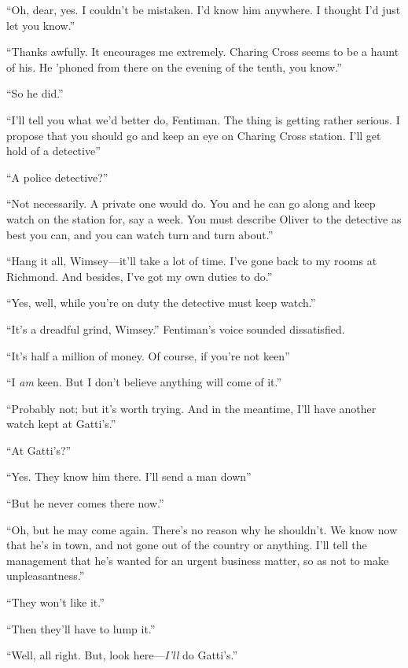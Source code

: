 \enquote{Oh, dear, yes. I couldn't be mistaken. I'd know him anywhere. I thought I'd just let you know.}

\enquote{Thanks awfully. It encourages me extremely. Charing Cross seems to be a haunt of his. He 'phoned from there on the evening of the tenth, you know.}

\enquote{So he did.}

\enquote{I'll tell you what we'd better do, Fentiman. The thing is getting rather serious. I propose that you should go and keep an eye on Charing Cross station. I'll get hold of a detective\longdash}

\enquote{A police detective?}

\enquote{Not necessarily. A private one would do. You and he can go along and keep watch on the station for, say a week. You must describe Oliver to the detective as best you can, and you can watch turn and turn about.}

\enquote{Hang it all, Wimsey\allowbreak---\allowbreak it'll take a lot of time. I've gone back to my rooms at Richmond. And besides, I've got my own duties to do.}

\enquote{Yes, well, while you're on duty the detective must keep watch.}

\enquote{It's a dreadful grind, Wimsey.} Fentiman's voice sounded dissatisfied.

\enquote{It's half a million of money. Of course, if you're not keen\longdash}

\enquote{I \textit{am} keen. But I don't believe anything will come of it.}

\enquote{Probably not; but it's worth trying. And in the meantime, I'll have another watch kept at Gatti's.}

\enquote{At Gatti's?}

\enquote{Yes. They know him there. I'll send a man down\longdash}

\enquote{But he never comes there now.}

\enquote{Oh, but he may come again. There's no reason why he shouldn't. We know now that he's in town, and not gone out of the country or anything. I'll tell the management that he's wanted for an urgent business matter, so as not to make unpleasantness.}

\enquote{They won't like it.}

\enquote{Then they'll have to lump it.}

\enquote{Well, all right. But, look here---\textit{I'll} do Gatti's.}

